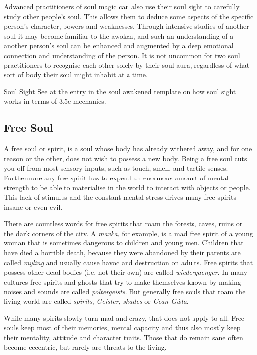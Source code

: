 Advanced practitioners of soul magic can also use their soul sight to
carefully study other people's soul. This allows them to deduce some aspects
of the specific person's character, powers and weaknesses. Through intensive
studies of another soul it may become familiar to the awoken, and such an
understanding of a another person's soul can be enhanced and augmented by a
deep emotional connection and understanding of the person. It is not uncommon
for two soul practitioners to recognise each other solely by their soul aura,
regardless of what sort of body their soul might inhabit at a time.

\begin{35e}{Soul Sight}
  See at the entry in the soul awakened template on how soul sight works in
  terms of 3.5e mechanics.
\end{35e}

\subsection{Free Soul}
\label{sec:Free Soul}

A free soul or spirit, is a soul whose body has already withered away, and for
one reason or the other, does not wish to possess a new body. Being a free
soul cuts you off from most sensory inputs, such as touch, smell, and tactile
senses. Furthermore any free spirit has to expend an enormous amount of mental
strength to be able to materialise in the world to interact with objects or
people. This lack of stimulus and the constant mental stress drives many free
spirits insane or even evil.

There are countless words for free spirits that roam the forests, caves, ruins
or the dark corners of the city. A \emph{mavka}, for example, is a mad free
spirit of a young woman that is sometimes dangerous to children and young men.
Children that have died a horrible death, because they were abandoned by their
parents are called \emph{myling} and usually cause havoc and destruction on
adults. Free spirits that possess other dead bodies (i.e. not their own) are
called \emph{wiedergaenger}. In many cultures free spirits and ghosts that try
to make themselves known by making noises and sounds are called
\emph{poltergeists}. But generally free souls that roam the living world are
called \emph{spirits}, \emph{Geister}, \emph{shades} or \emph{Cean Gŵla}.

While many spirits slowly turn mad and crazy, that does not apply to all. Free
souls keep most of their memories, mental capacity and thus also mostly keep
their mentality, attitude and character traits. Those that do remain sane
often become eccentric, but rarely are threats to the living.

